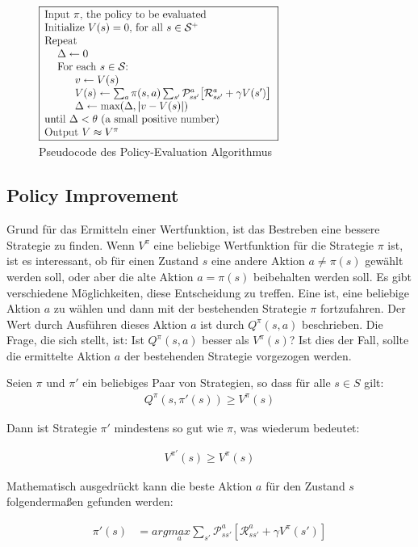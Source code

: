 \documentclass[10pt]{scrartcl}
\begin{document}
\begin{figure}[htc]
    \centering
    \includegraphics[width=0.7\textwidth]{Grafiken/21pe.png}
    \caption{Pseudocode des Policy-Evaluation Algorithmus}
    \label{fig:policyevaluation}
\end{figure}

\subsection{Policy Improvement}
Grund für das Ermitteln einer Wertfunktion, ist das Bestreben eine bessere Strategie zu finden. Wenn $V^\pi$ eine beliebige Wertfunktion für die  Strategie $\pi$ ist,  ist es interessant, ob für einen Zustand $s$ eine andere Aktion $a\neq\pi(s)$   gewählt werden soll, oder aber die alte Aktion $a=\pi(s)$ beibehalten werden soll.
Es gibt verschiedene Möglichkeiten, diese  Entscheidung zu treffen. Eine ist, eine beliebige Aktion $a$ zu wählen und dann mit der bestehenden Strategie $\pi$ fortzufahren. Der Wert durch Ausführen dieses Aktion $a$ ist durch $Q^\pi(s,a)$ beschrieben. Die Frage, die sich stellt, ist: Ist $Q^\pi(s,a)$ besser als $V^\pi(s)$?
Ist dies der Fall, sollte die ermittelte Aktion $a$ der bestehenden Strategie vorgezogen werden.

Seien $\pi$ und $\pi'$ ein beliebiges Paar von Strategien, so dass für alle $s \in S$ gilt:
\begin{align}
Q^\pi(s,\pi'(s)) \ge V^\pi(s)
\end{align}

Dann ist Strategie $\pi'$  mindestens so gut wie $\pi$, was wiederum bedeutet:

\begin{align}
V^{\pi'}(s) \ge V^\pi(s)
\end{align}

Mathematisch ausgedrückt kann die beste Aktion $a$ für den Zustand $s$ folgendermaßen gefunden werden:

\begin{align}\label{policy-improvement}
\pi'(s) &= arg\underset{a}{max}\sum_{s'}\mathcal{P}^a_{ss'}[\mathcal{R}^a_{ss'}+\gamma V^\pi(s')]
\end{align}
\end{document}
